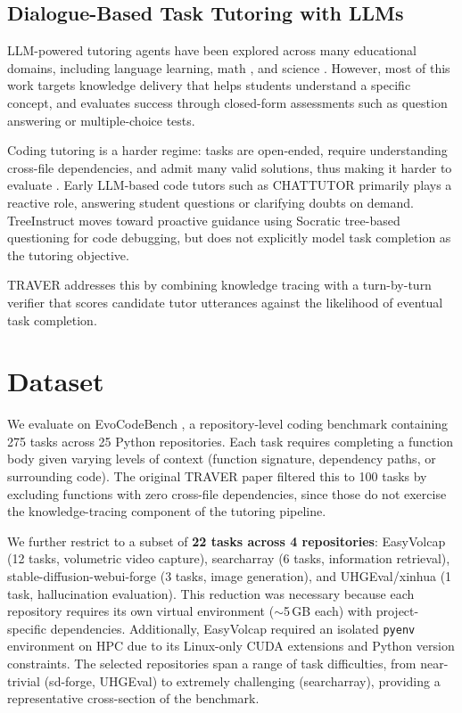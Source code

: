 \documentclass[11pt]{article}
\begin{document}
\subsection{Dialogue-Based Task Tutoring with LLMs}
LLM-powered tutoring agents have been explored across many educational domains, including language learning\cite{kwon-etal-2024-llms}, math \cite{wang-etal-2024-bridging}, and science \cite{zhang-etal-2024-comprehensive-survey}. However, most of this work targets knowledge delivery that helps students understand a specific concept, and evaluates success through closed-form assessments such as question answering or multiple-choice tests. 

Coding tutoring is a harder regime: tasks are open-ended, require understanding cross-file dependencies, and admit many valid solutions, thus making it harder to evaluate \cite{wang2025training}. Early LLM-based code tutors such as CHATTUTOR \cite{10.1145/3627673.3679665} primarily plays a reactive role, answering student questions or clarifying doubts on demand. TreeInstruct \cite{zhao-etal-2024-tree}  moves toward proactive guidance using Socratic tree-based questioning for code debugging, but does not explicitly model task completion as the tutoring objective.

TRAVER \cite{wang2025training} addresses this by combining knowledge tracing with a turn-by-turn verifier that scores candidate tutor utterances against the likelihood of eventual task completion. 

\section{Dataset}

We evaluate on EvoCodeBench \citep{li2024evocodebench}, a repository-level coding benchmark containing 275 tasks across 25 Python repositories. Each task requires completing a function body given varying levels of context (function signature, dependency paths, or surrounding code). The original TRAVER paper \cite{wang2025training} filtered this to 100 tasks by excluding functions with zero cross-file dependencies, since those do not exercise the knowledge-tracing component of the tutoring pipeline.

We further restrict to a subset of \textbf{22 tasks across 4 repositories}: EasyVolcap (12 tasks, volumetric video capture), searcharray (6 tasks, information retrieval), stable-diffusion-webui-forge (3 tasks, image generation), and UHGEval/xinhua (1 task, hallucination evaluation). This reduction was necessary because each repository requires its own virtual environment ($\sim$5\,GB each) with project-specific dependencies. Additionally, EasyVolcap required an isolated \texttt{pyenv} environment on HPC due to its Linux-only CUDA extensions and Python version constraints. The selected repositories span a range of task difficulties, from near-trivial (sd-forge, UHGEval) to extremely challenging (searcharray), providing a representative cross-section of the benchmark.
\end{document}
